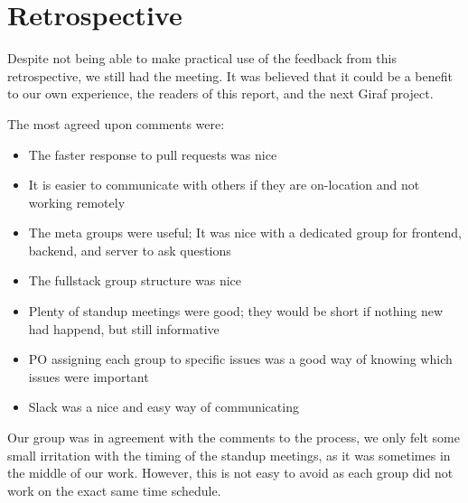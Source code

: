 \section{Retrospective}\label{SEC:Sprint4Retrospective}
Despite not being able to make practical use of the feedback from this retrospective, we still had the meeting. 
It was believed that it could be a benefit to our own experience, the readers of this report, and the next Giraf project.

The most agreed upon comments were:
\begin{itemize}
  \item The faster response to pull requests was nice
  \item It is easier to communicate with others if they are on-location and not working remotely
  \item The meta groups were useful; It was nice with a dedicated group for frontend, backend, and server to ask questions
  \item The fullstack group structure was nice
  \item Plenty of standup meetings were good; they would be short if nothing new had happend, but still informative
  \item PO assigning each group to specific issues was a good way of knowing which issues were important
  \item Slack was a nice and easy way of communicating
\end{itemize}

Our group was in agreement with the comments to the process, we only felt some small irritation with the timing of the standup meetings, as it was sometimes in the middle of our work. 
However, this is not easy to avoid as each group did not work on the exact same time schedule.

